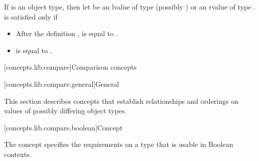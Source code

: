 \begin{addedblock}
\begin{itemdescr}
\pnum
If  is an object type, then let  be an lvalue of type (possibly
)  or an rvalue of type .
 is satisfied only if

\begin{itemize}
\item After the definition ,  is equal to .

\item {} is equal to .
\end{itemize}

\end{itemdescr}

[concepts.lib.compare]{Comparison concepts}

[concepts.lib.compare.general]{General}

\pnum
This section describes concepts that establish relationships and orderings
on values of possibly differing object types.

[concepts.lib.compare.boolean]{Concept }

\pnum
The  concept specifies the requirements on a type that is usable in Boolean contexts.


\end{addedblock}
